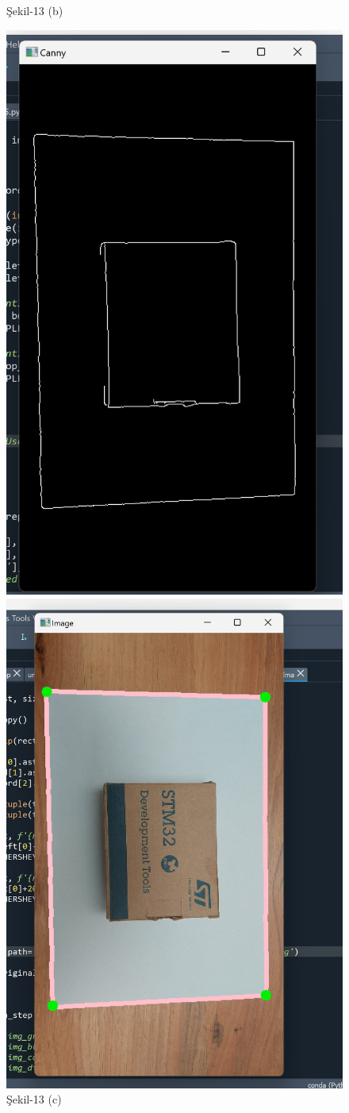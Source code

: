 \documentclass[11pt,a4paper]{report}
\begin{document}
\begin{figure}[!h]
\begin{minipage}[t]{0.470\linewidth}
			\caption*{Şekil-13 (b)}
		\end{minipage}
		
			\begin{minipage}[t]{0.470\linewidth}
			\centering
			\includegraphics[width=0.65\linewidth]{nesne-1-siyah-beyaz}
			\caption*{Şekil-13 (c)}
		\end{minipage}\hfill
		\begin{minipage}[t]{0.470\linewidth}
			\centering
			\includegraphics[width=0.65\linewidth]{nesne-1-a4}

\end{minipage}
\end{figure}
\end{document}
